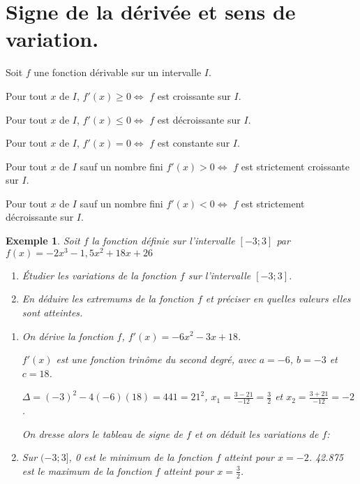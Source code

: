 \documentclass[a4paper,11pt]{article}
\theoremstyle{break}
\newcounter{enonce}
\newtheorem{exemple}[enonce]{Exemple}
\begin{document}
\section{Signe de la dérivée et sens de variation.}
  
  \begin{theorem}
    
   Soit $f$ une fonction dérivable sur un intervalle $I$.
   
   Pour tout $x$ de $I$, $f'(x) \geq 0 \Leftrightarrow$ $f$ est croissante sur $I$.
   
   Pour tout $x$ de $I$, $f'(x) \leq 0 \Leftrightarrow$ $f$ est décroissante sur $I$.
   
   Pour tout $x$ de $I$, $f'(x)=0 \Leftrightarrow$ $f$ est constante sur $I$.
   
   Pour tout $x$ de $I$ sauf un nombre fini $f'(x) >0
   \Leftrightarrow$ $f$ est strictement croissante sur $I$.
   
   Pour tout $x$ de $I$ sauf un nombre fini $f'(x) <0
   \Leftrightarrow$ $f$ est strictement décroissante sur $I$.
  \end{theorem}
  
   \begin{exemple}
  
    Soit $f$ la fonction définie sur l'intervalle $[-3;3]$ par $f(x)=-2x^3 -1,5x^2+18 x + 26$
    
    \begin{enumerate}
     \item \'Etudier les variations de la fonction $f$ sur l'intervalle $[-3;3]$.
     \item En déduire les extremums de la fonction $f$ et préciser en quelles valeurs elles sont
     atteintes.
    \end{enumerate}
    
    \begin{enumerate}
     \item On dérive la fonction $f$, $f'(x)=-6x^2-3x+18$.
     
     $f'(x)$ est une fonction trinôme du second degré, avec $a=-6$, $b=-3$ et $c=18$.
     
     $\Delta=(-3)^2-4(-6)(18)=441=21^2$, $x_1=\frac{3-21}{-12}=\frac{3}{2}$ et 
     $x_2=\frac{3+21}{-12}=-2$.
     
     On dresse alors le tableau de signe de $f$ et on déduit les variations de $f$:
      
     \item Sur $(-3;3]$, 0 est le minimum de la fonction $f$ atteint pour $x=-2$. 42.875 est le maximum
     de la fonction $f$ atteint pour $x=\frac{3}{2}$.
    \end{enumerate}
 \end{exemple}
\end{document}
